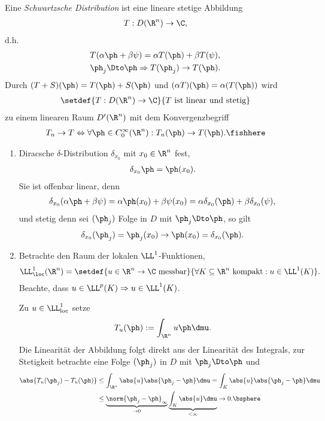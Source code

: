 \begin{defn}
\label{defn:3.4}
Eine \emph{Schwartzsche Distribution} ist eine lineare stetige Abbildung
\begin{align*}
T: D(\R^n)\to \C,
\end{align*}
d.h.
\begin{align*}
&T(\alpha \ph + \beta \psi) = \alpha T(\ph) + \beta T(\psi),\\
&\ph_j \Dto \ph \Rightarrow T(\ph_j) \to T(\ph).
\end{align*}
Durch $(T+S)(\ph) = T(\ph) + S(\ph)$ und $(\alpha T)(\ph) = \alpha (T(\ph))$
wird
\begin{align*}
\setdef{T: D(\R^n)\to \C}{T\text{ ist linear und stetig}}
\end{align*}
zu einem linearen Raum $D'(\R^n)$ mit dem Konvergenzbegriff
\begin{align*}
T_n\to T \Leftrightarrow \forall \ph\in C_0^\infty(\R^n) : T_n(\ph) \to
T(\ph).\fishhere
\end{align*}
\end{defn}

\begin{bsp}
\label{bsp:3.5}
\begin{enumerate}[label=\alph{*})]
  \item Diracsche $\delta$-Distribution $\delta_{x_0}$ mit $x_0\in\R^n$ fest,
\begin{align*}
\delta_{x_0}\ph = \ph(x_0).
\end{align*}
Sie ist offenbar linear, denn
\begin{align*}
\delta_{x_0}(\alpha\ph + \beta\psi) = \alpha\ph(x_0) + \beta\psi(x_0) = \alpha
\delta_{x_0}(\ph) + \beta \delta_{x_0}(\psi),
\end{align*}
und stetig denn sei $(\ph_j)$ Folge in $D$ mit $\ph_j \Dto \ph$, so gilt
\begin{align*}
\delta_{x_0}(\ph_j) = \ph_j(x_0) \to \ph(x_0) = \delta_{x_0}(\ph).
\end{align*}
\item Betrachte den Raum der lokalen $\LL^1$-Funktionen,
\begin{align*}
\LL^1_\loc(\R^n) = \setdef{u\in \R^n \to \C \text{ messbar}}{\forall
K\subseteq \R^n\text{ kompakt} : u\in\LL^1(K)}.
\end{align*}
Beachte, dass $u\in\LL^p(K)\Rightarrow u\in\LL^1(K)$.

Zu $u\in \LL^1_{\text{loc}}$ setze
\begin{align*}
T_u(\ph) := \int_{\R^n} u\ph\dmu.
\end{align*}
Die Linearität der Abbildung folgt direkt aus der Linearität des Integrals, zur
Stetigkeit betrachte eine Folge $(\ph_j)$ in $D$ mit $\ph_j \Dto \ph$ und
\begin{align*}
\abs{T_u(\ph_j)-T_u(\ph)} &\le \int_{\R^n} \abs{u}\abs{\ph_j - \ph}\dmu = 
\int_K \abs{u}\abs{\ph_j-\ph}\dmu \\ &\le
\underbrace{\norm{\ph_j - \ph}_\infty}_{\to 0} \underbrace{\int_K
\abs{u}\dmu}_{< \infty} \to 0.\bsphere
\end{align*}
\end{enumerate}
\end{bsp}

